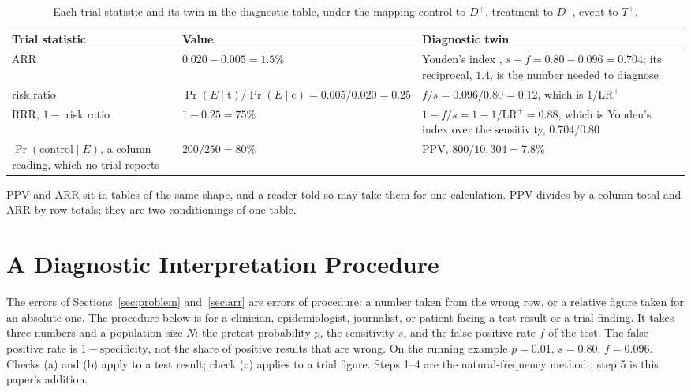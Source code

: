 \documentclass[11pt]{article}
\begin{document}
\begin{table}[H]
\centering
\renewcommand{\arraystretch}{1.25}
\begin{tabular}{P{0.2\textwidth}|P{0.3\textwidth}|P{0.34\textwidth}}
\toprule
\textbf{Trial statistic} & \textbf{Value} & \textbf{Diagnostic twin} \\
\midrule
ARR & $0.020 - 0.005 = 1.5\%$ & Youden's index \cite{youden1950}, $s - f = 0.80 - 0.096 = 0.704$; its reciprocal, $1.4$, is the number needed to diagnose \cite{linn2006} \\
risk ratio & $\Pr(E \mid \text{t}) / \Pr(E \mid \text{c}) = 0.005 / 0.020 = 0.25$ & $f / s = 0.096 / 0.80 = 0.12$, which is $1 / \mathrm{LR}^+$ \\
RRR, $1 -$ risk ratio & $1 - 0.25 = 75\%$ & $1 - f/s = 1 - 1/\mathrm{LR}^+ = 0.88$, which is Youden's index over the sensitivity, $0.704 / 0.80$ \\
$\Pr(\text{control} \mid E)$, a column reading, which no trial reports & $200 / 250 = 80\%$ & PPV, $800 / 10{,}304 = 7.8\%$ \\
\bottomrule
\end{tabular}
\caption{Each trial statistic and its twin in the diagnostic table, under the mapping control to $D^+$, treatment to $D^-$, event to $T^+$.}
\label{tab:twins}
\end{table}

PPV and ARR sit in tables of the same shape, and a reader told so may take them for one calculation. PPV divides by a column total and ARR by row totals; they are two conditionings of one table.

\section{A Diagnostic Interpretation Procedure}
\label{sec:proc}

The errors of Sections~\ref{sec:problem} and~\ref{sec:arr} are errors of procedure: a number taken from the wrong row, or a relative figure taken for an absolute one. The procedure below is for a clinician, epidemiologist, journalist, or patient facing a test result or a trial finding. It takes three numbers and a population size $N$: the pretest probability $p$, the sensitivity $s$, and the false-positive rate $f$ of the test. The false-positive rate is $1 - \text{specificity}$, not the share of positive results that are wrong. On the running example $p = 0.01$, $s = 0.80$, $f = 0.096$. Checks (a) and (b) apply to a test result; check (c) applies to a trial figure. Steps 1--4 are the natural-frequency method \cite{gigerenzer1995, hoffrage1998}; step 5 is this paper's addition.
\end{document}
